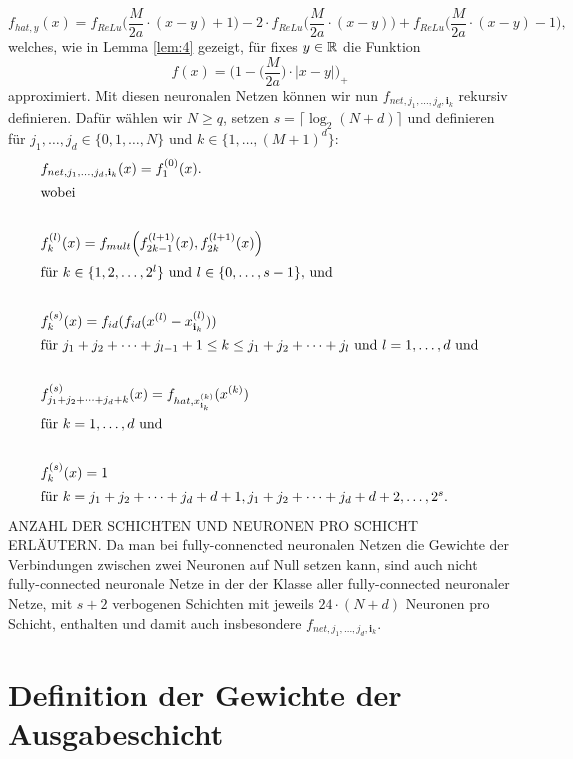 \begin{equation}
\label{def:fhat}
f_{hat,y}(x) = f_{ReLu}\bigg(\frac{M}{2a} \cdot (x - y) + 1\bigg) - 2 \cdot f_{ReLu}\bigg(\frac{M}{2a} \cdot (x - y)\bigg) +  f_{ReLu}\bigg(\frac{M}{2a} \cdot (x - y) - 1\bigg),
\end{equation}
welches, wie in Lemma \ref{lem:4} gezeigt, für fixes $y \in \mathbb{R}$ die Funktion $$f(x) = \bigg(1 - \bigg(\frac{M}{2a}\bigg) \cdot |x - y|\bigg)_+$$ approximiert. 
Mit diesen neuronalen Netzen können wir nun $f_{net,j_1,\dots,j_d,\mathbf{i}_k}$ rekursiv definieren. Dafür wählen wir $N \geq q$, setzen $s = \lceil\log_2(N + d)\rceil$ und definieren für $j_1,\dots,j_d \in \{0, 1,\dots, N\}$ und $k \in \{1,\dots,(M + 1)^d\}\colon$  
\begin{align*}
\label{fnet}
& f_{net,j_1,\dots,j_d,\mathbf{i}_k}(x) = f_1^{(0)}(x). \\
\intertext{wobei} \\
& f_k^{(l)}(x) = f_{mult}\Big(f_{2k - 1}^{(l + 1)}(x),f_{2k}^{(l + 1)}(x)\Big) \\
\intertext{für $k \in \{1, 2, \dots, 2^l \}$ und $l \in\{0,\dots,s - 1\}, $ und} \\
& f_k^{(s)}(x) = f_{id}(f_{id}(x^{(l)} - x_{\mathbf{i}_k}^{(l)}))  \\
\intertext{für $j_1 + j_2 + \dots + j_{l-1} + 1 \leq k \leq j_1 + j_2 + \dots + j_l$ und $l = 1,\dots,d$ und} \\ 
& f_{j_1 + j_2 + \dots + j_d + k}^{(s)}(x) = f_{hat,x_{\mathbf{i}_k}^{(k)}}(x^{(k)}) \\
\intertext{für $k = 1,\dots,d$ und} \\
& f_k^{(s)}(x) = 1 \\
\intertext{für $k = j_1 + j_2 + \dots + j_d + d + 1,j_1 + j_2 + \dots + j_d + d + 2,\dots,2^s.$}
\end{align*} 
ANZAHL DER SCHICHTEN UND NEURONEN PRO SCHICHT ERLÄUTERN.
Da man bei fully-connencted neuronalen Netzen die Gewichte der Verbindungen zwischen zwei Neuronen auf Null setzen kann, sind auch nicht fully-connected neuronale Netze in der der Klasse aller fully-connected neuronaler Netze, mit $s + 2$ verbogenen Schichten mit jeweils $24 \cdot (N + d)$ Neuronen pro Schicht, enthalten und damit auch insbesondere $f_{net,j_1,\dots,j_d,\mathbf{i}_k}$.


\section{Definition der Gewichte der Ausgabeschicht}

